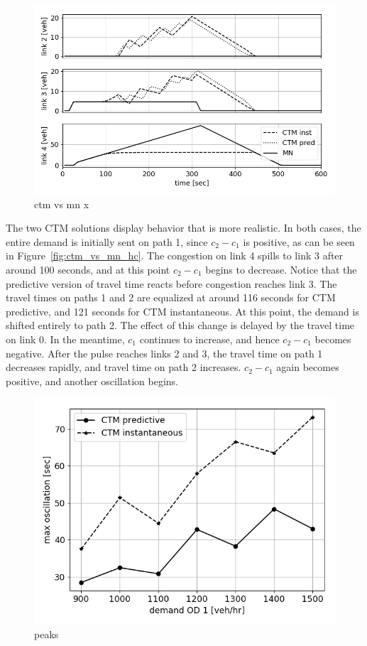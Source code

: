 \begin{figure}[h]
    \centering
    \includegraphics[width=\linewidth]{figs/ctm_vs_mn_x.png}
    \caption{ctm vs mn x}
    \label{fig:ctm_vs_mn_x}
\end{figure}
The two CTM solutions display behavior that is more realistic. In both cases, the entire demand is initially sent on path 1, since $c_2-c_1$ is positive, as can be seen in Figure~\ref{fig:ctm_vs_mn_hc}. The congestion on link 4 spills to link 3 after around 100 seconds, and at this point $c_2-c_1$ begins to decrease. Notice that the predictive version of travel time reacts before congestion reaches link 3. The travel times on paths 1 and 2 are equalized at around 116 seconds for CTM predictive, and 121 seconds for CTM instantaneous. At this point, the demand is shifted entirely to path 2. The effect of this change is delayed by the travel time on link 0. In the meantime, $c_1$ continues to increase, and hence $c_2-c_1$ becomes negative. After the pulse reaches links 2 and 3, the travel time on path 1 decreases rapidly, and travel time on path 2 increases. $c_2-c_1$ again becomes positive, and another oscillation begins. 

\begin{figure}[h]
    \centering
    \includegraphics[width=0.8\linewidth]{figs/peaks.png}
    \caption{peaks }
    \label{fig:peaks}
\end{figure}


